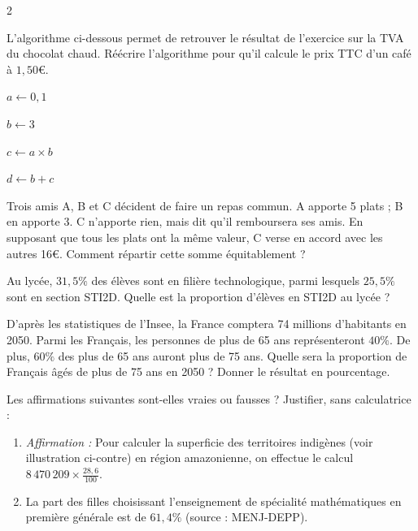 \documentclass[10pt,a4paper]{article}
\begin{document}
\begin{multicols}{2}
\begin{exo}
L'algorithme ci-dessous permet de retrouver le résultat de l'exercice sur la TVA du chocolat chaud. Réécrire l'algorithme pour qu'il calcule le prix TTC d'un café à $1,50$€.

\begin{leftbar}
$a \leftarrow 0,1$

$b \leftarrow 3$

$c \leftarrow a \times b$

$d \leftarrow b + c$
\end{leftbar}
\end{exo}

\begin{exo}
Trois amis A, B et C décident de faire un repas commun. A apporte 5 plats ; B en apporte 3. C n'apporte rien, mais dit qu'il remboursera ses amis. En supposant que tous les plats ont la même valeur, C verse en accord avec les autres 16€. Comment répartir cette somme équitablement ?
\end{exo}

\begin{exo}
Au lycée, $31,5\%$ des élèves sont en filière technologique, parmi lesquels $25,5\%$ sont en section STI2D. Quelle est la proportion d'élèves en STI2D au lycée ?
\end{exo}

\begin{exo}
D'après les statistiques de l'Insee, la France comptera 74 millions d'habitants en 2050. Parmi les Français, les personnes de plus de 65 ans représenteront $40\%$. De plus, $60\%$ des plus de 65 ans auront plus de 75 ans. Quelle sera la proportion de Français âgés de plus de 75 ans en 2050 ? Donner le résultat en pourcentage.
\end{exo}

\begin{minipage}{0.6\textwidth}
\begin{exo}
Les affirmations suivantes sont-elles vraies ou fausses ? Justifier, sans calculatrice :
\begin{enumerate}[leftmargin=*]
    \item \textit{Affirmation :} Pour calculer la superficie des territoires indigènes (voir illustration ci-contre) en région amazonienne, on effectue le calcul $\displaystyle 8\,470\,209 \times \frac{28,6}{100}$.
    \item La part des filles choisissant l'enseignement de spécialité mathématiques en première générale est de $61,4\%$ (source : MENJ-DEPP).


\end{enumerate}
\end{exo}
\end{minipage}
\end{multicols}
\end{document}
